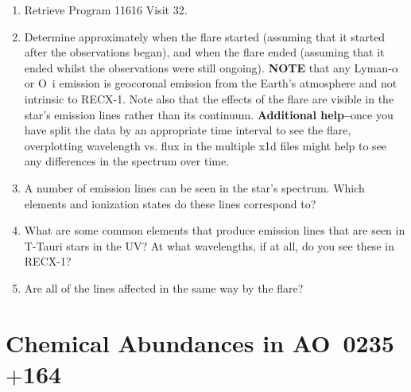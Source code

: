 \begin{enumerate}
	\item Retrieve Program 11616 Visit 32.
	\item Determine approximately when the flare started (assuming that it started after the observations began),
		and when the flare ended (assuming that it ended whilst the observations were still ongoing). \textbf{NOTE} that any
		Lyman-$\alpha$ or O~{\sc i} emission is geocoronal emission from the Earth's atmosphere and not intrinsic to RECX-1. 
		Note also that the effects of the flare are visible in the star's emission lines rather than its continuum. \textbf{Additional help--}once you have split the data by an appropriate time interval to see the flare, overplotting wavelength vs. flux in the multiple x1d files might help to see any differences in the spectrum over time.
	\item A number of emission lines can be seen in the star's spectrum. Which elements and ionization states do these
		lines correspond to?
         \item {What are some common elements that produce emission lines that are seen in T-Tauri stars in the UV? At what wavelengths, if at all, do you see these in
                  RECX-1?}
	\item Are all of the lines affected in the same way by the flare?
\end{enumerate}

\section{Chemical Abundances in AO~0235$+$164}

